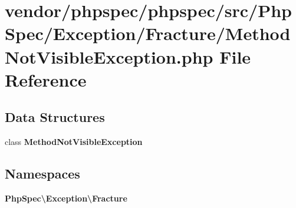 \section{vendor/phpspec/phpspec/src/\+Php\+Spec/\+Exception/\+Fracture/\+Method\+Not\+Visible\+Exception.php File Reference}
\label{_method_not_visible_exception_8php}
\subsection*{Data Structures}
\begin{DoxyCompactItemize}
\item 
class {\bf Method\+Not\+Visible\+Exception}
\end{DoxyCompactItemize}
\subsection*{Namespaces}
\begin{DoxyCompactItemize}
\item 
 {\bf Php\+Spec\textbackslash{}\+Exception\textbackslash{}\+Fracture}
\end{DoxyCompactItemize}
